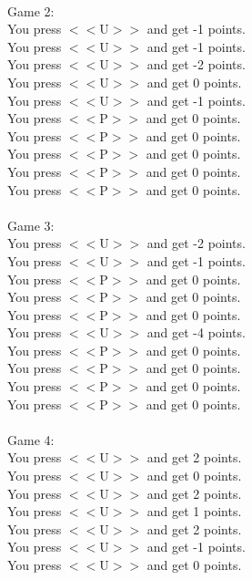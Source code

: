 \documentclass[pdflatex,sn-nature]{sn-jnl}%
\theoremstyle{thmstyleone}%
\theoremstyle{thmstyletwo}%
\theoremstyle{thmstylethree}%
\begin{document}
 $~$\\ 
Game 2: $~$\\ 
You press $<<$U$>>$ and get -1 points. $~$\\ 
You press $<<$U$>>$ and get -1 points. $~$\\ 
You press $<<$U$>>$ and get -2 points. $~$\\ 
You press $<<$U$>>$ and get 0 points. $~$\\ 
You press $<<$U$>>$ and get -1 points. $~$\\ 
You press $<<$P$>>$ and get 0 points. $~$\\ 
You press $<<$P$>>$ and get 0 points. $~$\\ 
You press $<<$P$>>$ and get 0 points. $~$\\ 
You press $<<$P$>>$ and get 0 points. $~$\\ 
You press $<<$P$>>$ and get 0 points. $~$\\ 
 $~$\\ 
Game 3: $~$\\ 
You press $<<$U$>>$ and get -2 points. $~$\\ 
You press $<<$U$>>$ and get -1 points. $~$\\ 
You press $<<$P$>>$ and get 0 points. $~$\\ 
You press $<<$P$>>$ and get 0 points. $~$\\ 
You press $<<$P$>>$ and get 0 points. $~$\\ 
You press $<<$U$>>$ and get -4 points. $~$\\ 
You press $<<$P$>>$ and get 0 points. $~$\\ 
You press $<<$P$>>$ and get 0 points. $~$\\ 
You press $<<$P$>>$ and get 0 points. $~$\\ 
You press $<<$P$>>$ and get 0 points. $~$\\ 
 $~$\\ 
Game 4: $~$\\ 
You press $<<$U$>>$ and get 2 points. $~$\\ 
You press $<<$U$>>$ and get 0 points. $~$\\ 
You press $<<$U$>>$ and get 2 points. $~$\\ 
You press $<<$U$>>$ and get 1 points. $~$\\ 
You press $<<$U$>>$ and get 2 points. $~$\\ 
You press $<<$U$>>$ and get -1 points. $~$\\ 
You press $<<$U$>>$ and get 0 points. $~$\\ 
\end{document}

